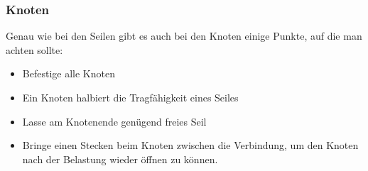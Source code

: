 \subsubsection{Knoten}

Genau wie bei den Seilen gibt es auch bei den Knoten einige Punkte, auf die man achten sollte:
\begin{itemize}
\item Befestige alle Knoten
\item Ein Knoten halbiert die Tragfähigkeit eines Seiles
\item Lasse am Knotenende genügend freies Seil
\item Bringe einen Stecken beim Knoten zwischen die Verbindung, um den Knoten nach der Belastung wieder öffnen zu können.
\end{itemize}

